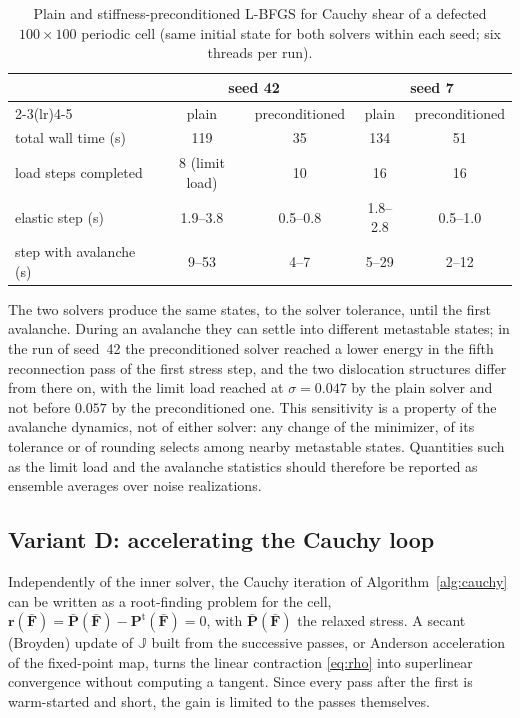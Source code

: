 \documentclass[11pt,a4paper]{article}
\newcommand{\Fb}{\bar{\mathbf F}}
\newcommand{\Pb}{\bar{\mathbf P}}
\newcommand{\Pt}{\mathbf P^{\mathrm t}}
\begin{document}
\begin{table}[ht]
\centering\small
\begin{tabular}{@{}lcccc@{}}
\toprule
& \multicolumn{2}{c}{seed 42} & \multicolumn{2}{c}{seed 7}\\
\cmidrule(lr){2-3}\cmidrule(lr){4-5}
& plain & preconditioned & plain & preconditioned\\
\midrule
total wall time (s) & 119 & 35 & 134 & 51\\
load steps completed & 8 (limit load) & 10 & 16 & 16\\
elastic step (s) & 1.9--3.8 & 0.5--0.8 & 1.8--2.8 & 0.5--1.0\\
step with avalanche (s) & 9--53 & 4--7 & 5--29 & 2--12\\
\bottomrule
\end{tabular}
\caption{Plain and stiffness-preconditioned L-BFGS for Cauchy shear of a defected
\(100\times100\) periodic cell (same initial state for both solvers within each seed; six
threads per run).}
\label{tab:precond}
\end{table}

The two solvers produce the same states, to the solver tolerance, until the first avalanche.
During an avalanche they can settle into different metastable states; in the run of seed~42 the
preconditioned solver reached a lower energy in the fifth reconnection pass of the first stress
step, and the two dislocation structures differ from there on, with the limit load reached at
\(\sigma=0.047\) by the plain solver and not before \(0.057\) by the preconditioned one. This
sensitivity is a property of the avalanche dynamics, not of either solver: any change of the
minimizer, of its tolerance or of rounding selects among nearby metastable states. Quantities such
as the limit load and the avalanche statistics should therefore be reported as ensemble averages
over noise realizations.

\subsection{Variant D: accelerating the Cauchy loop}

Independently of the inner solver, the Cauchy iteration of Algorithm~\ref{alg:cauchy} can be
written as a root-finding problem for the cell, \(\mathbf r(\Fb)=\Pb(\Fb)-\Pt(\Fb)=0\), with
\(\Pb(\Fb)\) the relaxed stress. A secant (Broyden) update of \(\mathbb J\) built from the successive
passes, or Anderson acceleration of the fixed-point map, turns the linear contraction
\eqref{eq:rho} into superlinear convergence without computing a tangent. Since every pass after the
first is warm-started and short, the gain is limited to the passes themselves.
\end{document}
